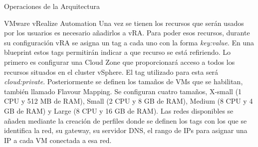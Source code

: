 \begin{subsection}{Operaciones de la Arquitectura}
\begin{subsubsection}{VMware vRealize Automation}
        Una vez se tienen los recursos que serán usados por los usuarios es necesario añadirlos a vRA. Para poder esos recursos, durante su configuración vRA se asigna un tag a cada uno con la forma \textit{key:value}. En una blueprint estos tags permitirán indicar a que recurso se está refiriendo. 
        Lo primero es configurar una Cloud Zone que proporcionará acceso a todos los recursos situados en el cluster vSphere. El tag utilizado para esta será \textit{cloud:private}. Posteriormente se definen los tamaños de VMs que se habilitan, también llamado Flavour Mapping. Se configuran cuatro tamaños, X-small (1 CPU y 512 MB de RAM), Small (2 CPU y 8 GB de RAM), Medium (8 CPU y 4 GB de RAM) y Large (8 CPU y 16 GB de RAM). Las redes disponibles se añaden mediante la creación de perfiles donde se definen los tags con los que se identifica la red, su gateway, su servidor DNS, el rango de IPs para asignar una IP a cada VM conectada a esa red. 



\end{subsubsection}
\end{subsection}
